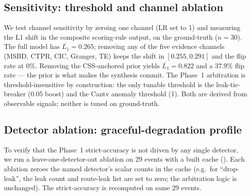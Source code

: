 \subsection{Sensitivity: threshold and channel ablation}
\label{sec:sensitivity}

We test channel sensitivity by zeroing one channel
(LR set to 1) and measuring the L1 shift in the
composite scoring-rule output, on
the ground-truth ($n{=}30$). The full \hcaf{} model
has $\overline{L_1}{=}0.265$; removing any of the five
evidence channels (MSBD, CTPR, CIC, Granger, TE) keeps
the shift in $[0.255, 0.291]$ and the flip rate at
$0\%$. Removing the CSS-anchored prior yields
$\overline{L_1}{=}0.822$ and a $37.9\%$ flip rate --- the
prior is what makes the synthesis commit. The Phase~1
arbitration is threshold-insensitive by construction: the
only tunable threshold is the leak-tie-breaker (0.05
boost) and the Cantv anomaly threshold (1). Both are
derived from observable signals; neither is tuned on
ground-truth.

\subsection{Detector ablation: graceful-degradation profile}
\label{sec:detector-ablation}

To verify that the Phase~1 strict-accuracy is not driven by
any single detector, we run a leave-one-detector-out
ablation on 29 events with a built cache
(). Each ablation zeroes the
named detector's scalar counts in the cache (e.g.\ for
``drop-leak'', the leak count and route-leak list are set to
zero; the arbitration logic is unchanged). The
strict-accuracy is recomputed on same 29 events.

